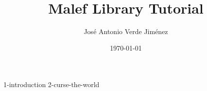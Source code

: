 \documentclass [12pt,a4paper] {article}
\author {José Antonio Verde Jiménez}
\date {\today}
\title {Malef Library Tutorial}
\begin{document}
   \maketitle
   \newpage
   \tableofcontents
   \newpage
   \setcounter{page}{2}

    {1-introduction}
    {2-curse-the-world}
\end{document}
